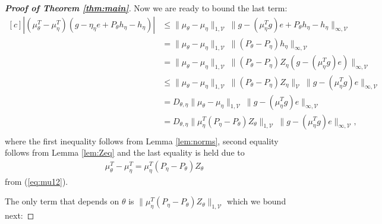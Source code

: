 \documentclass[11pt]{article}
\newcommand{\V}{\mathcal{V}}
\theoremstyle{definition}
\numberwithin{equation}{section}
\begin{document}
\begin{proof}[\textbf{Proof of Theorem \ref{thm:main}}]
Now we are ready to bound the last term:
\begin{equation*}
\begin{aligned}[c]
 \left|(\mu_{\theta}^T - \mu_{\eta}^T)   (g - \eta_{\eta}e +P_\theta h_{\eta}  - h_{\eta} )\right|&\leq \|\mu_{\theta} - \mu_{\eta}  \|_{1, \V}~ \|g - (\mu_{\eta}^T g)e +P_\theta h_{\eta}  - h_{\eta} \|_{\infty, \V} \\
 &=\|\mu_{\theta} - \mu_{\eta}  \|_{1, \V}~\|( P_\theta - P_{\eta}) h_{\eta}  \|_{\infty, \V}\\
 &= \|\mu_{\theta} - \mu_{\eta}  \|_{1, \V}~\| (P_\theta - P_{\eta})Z_{\eta} (g - (\mu_{\eta}^T g)e)  \|_{\infty, \V} \\
 &\leq  \|\mu_{\theta} - \mu_{\eta}  \|_{1, \V}~\| (P_\theta - P_{\eta}) Z_{\eta}\|_\V~ \| g - (\mu_\eta^Tg) e  \|_{\infty, \V}\\
 &=  D_{\theta, \eta}  \|\mu_{\theta} - \mu_{\eta}  \|_{1, \V}~\| g -(\mu_{\eta}^T g) e  \|_{\infty, \V}   \\
 &  =  D_{\theta, \eta} \| \mu_{\eta}^T(P_{\eta} - P_{\theta}) Z_\theta \|_{1, \V}~\| g - (\mu_\eta^Tg) e  \|_{\infty, \V},\\
\end{aligned}
 \end{equation*}
where the first inequality follows from Lemma  \ref{lem:norms}, second equality follows from Lemma \ref{lem:Zeq} and the last equality is held due to
\begin{align*}
\mu_{\theta}^T - \mu_{\eta}^T  =  \mu_{\eta}^T(P_{\eta} - P_{\theta}) Z_\theta
\end{align*}
from (\ref{eq:mu12}).


    The only term that depends on $\theta$ is $\| \mu_{\eta}^T(P_{\eta} - P_{\theta}) Z_\theta \|_{1, \V}^{ }$ which we bound next:



\end{proof}
\end{document}
